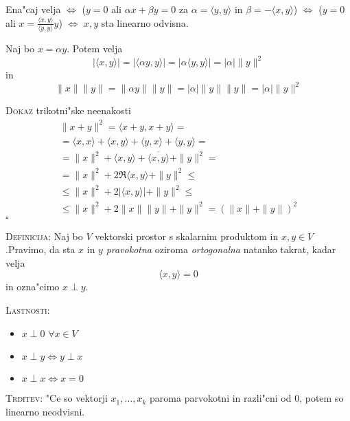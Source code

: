 Ena"caj velja $\iff$ ($y = 0$ ali $\alpha x + \beta y = 0$ za $\alpha = \langle y, y \rangle$ in $\beta = -\langle x, y \rangle$) $\iff$ ($y = 0$ ali $x = \frac{\langle x, y \rangle}{\langle y, y \rangle} y$) $\iff$ $x, y$ sta linearno odvisna.

Naj bo $x = \alpha y$. Potem velja
\begin{equation*}
|\langle x, y \rangle| = |\langle \alpha y, y \rangle| = |\alpha \langle y, y \rangle| = |\alpha| \| y \|^2
\end{equation*}
in
\begin{equation*}
\| x \| \| y \| = \| \alpha y \| \| y \| = |\alpha| \| y \| \| y \| = | \alpha | \| y \|^2
\end{equation*}

\textsc{Dokaz} trikotni"ske neenakosti 
\begin{multline*}
\| x + y \|^2 = \langle x + y, x + y \rangle = \\
= \langle x, x \rangle + \langle x, y \rangle + \langle y, x \rangle + \langle y, y \rangle = \\
= \| x \| ^2 + \langle x, y \rangle + \overline{\langle x, y \rangle} + \| y \| ^2  = \\
= \| x \|^2 + 2 \Re \langle x, y \rangle + \| y \|^2 \leq \\
\leq \| x \|^2 + 2|\langle x, y \rangle| + \| y \|^2 \leq \\
\leq \| x \|^2 + 2 \|x\| \|y\| + \| y \|^2 = (\| x \| + \| y \|)^2
\end{multline*}
\hfill $\square$

\textsc{Definicija:} Naj bo $V$ vektorski prostor s skalarnim produktom in $x, y \in V$.Pravimo, da sta $x$ in $y$ \emph{pravokotna} oziroma \emph{ortogonalna} natanko takrat, kadar velja
\begin{equation*}
\langle x, y \rangle = 0
\end{equation*}
in ozna"cimo $x \perp y$.

\textsc{Lastnosti:}
\begin{itemize}
    \item $x \perp 0$ \hfill $\forall x \in V$
    \item $x \perp y \iff y \perp x$
    \item $x \perp x \iff x = 0$
\end{itemize}

\textsc{Trditev:} "Ce so vektorji $x_1, \ldots, x_k$ paroma parvokotni in razli"cni od 0, potem so linearno neodvisni.

